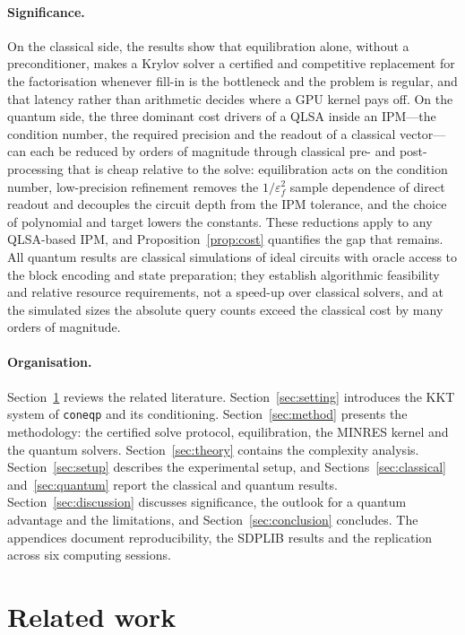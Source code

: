 \documentclass[11pt]{article}
\theoremstyle{definition}
\newcommand{\eps}{\varepsilon}
\begin{document}
\paragraph{Significance.} On the classical side, the results show that equilibration alone, without a preconditioner, makes a Krylov solver a certified and competitive replacement for the factorisation whenever fill-in is the bottleneck and the problem is regular, and that latency rather than arithmetic decides where a GPU kernel pays off. On the quantum side, the three dominant cost drivers of a QLSA inside an IPM---the condition number, the required precision and the readout of a classical vector---can each be reduced by orders of magnitude through classical pre- and post-processing that is cheap relative to the solve: equilibration acts on the condition number, low-precision refinement removes the $1/\eps_f^{2}$ sample dependence of direct readout and decouples the circuit depth from the IPM tolerance, and the choice of polynomial and target lowers the constants. These reductions apply to any QLSA-based IPM, and Proposition~\ref{prop:cost} quantifies the gap that remains. All quantum results are classical simulations of ideal circuits with oracle access to the block encoding and state preparation; they establish algorithmic feasibility and relative resource requirements, not a speed-up over classical solvers, and at the simulated sizes the absolute query counts exceed the classical cost by many orders of magnitude.

\paragraph{Organisation.} Section~\ref{sec:related} reviews the related literature. Section~\ref{sec:setting} introduces the KKT system of \texttt{coneqp} and its conditioning. Section~\ref{sec:method} presents the methodology: the certified solve protocol, equilibration, the MINRES kernel and the quantum solvers. Section~\ref{sec:theory} contains the complexity analysis. Section~\ref{sec:setup} describes the experimental setup, and Sections~\ref{sec:classical} and~\ref{sec:quantum} report the classical and quantum results. Section~\ref{sec:discussion} discusses significance, the outlook for a quantum advantage and the limitations, and Section~\ref{sec:conclusion} concludes. The appendices document reproducibility, the SDPLIB results and the replication across six computing sessions.

\section{Related work}\label{sec:related}
\end{document}
